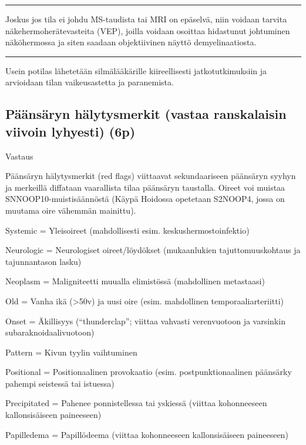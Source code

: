 \documentclass[
]{book}
\begin{document}
\begin{center}\rule{0.5\linewidth}{0.5pt}\end{center}

Joskus jos tila ei johdu MS-taudista tai MRI on epäselvä, niin voidaan tarvita näkehermoherätevasteita (VEP), joilla voidaan osoittaa hidastunut johtuminen näköhermossa ja siten saadaan objektiivinen näyttö demyelinaatiosta.

\begin{center}\rule{0.5\linewidth}{0.5pt}\end{center}

Usein potilas lähetetään silmälääkärille kiireellisesti jatkotutkimuksiin ja arvioidaan tilan vaikeusastetta ja paranemista.

\subsection{Päänsäryn hälytysmerkit (vastaa ranskalaisin viivoin lyhyesti) (6p)}\label{puxe4uxe4nsuxe4ryn-huxe4lytysmerkit-vastaa-ranskalaisin-viivoin-lyhyesti-6p}

Vastaus

Päänsäryn hälytysmerkit (red flags) viittaavat sekundaariseen päänsäryn syyhyn ja merkeillä diffataan vaarallista tilaa päänsäryn taustalla. Oireet voi muistaa SNNOOP10-muistisäännöstä (Käypä Hoidossa opetetaan S2NOOP4, jossa on muutama oire vähemmän mainittu).

Systemic = Yleisoireet (mahdollisesti esim. keskushermostoinfektio)

Neurologic = Neurologiset oireet/löydökset (mukaanlukien tajuttomuuskohtaus ja tajunnantason lasku)

Neoplasm = Maligniteetti muualla elimistössä (mahdollinen metastaasi)

Old = Vanha ikä (\textgreater50v) ja uusi oire (esim. mahdollinen temporaaliarteriitti)

Onset = Äkillisyys (``thunderclap''; viittaa vahvasti verenvuotoon ja varsinkin subaraknoidaalivuotoon)

Pattern = Kivun tyylin vaihtuminen

Positional = Positionaalinen provokaatio (esim. postpunktionaalinen päänsärky pahempi seistessä tai istuessa)

Precipitated = Pahenee ponnistellessa tai yskiessä (viittaa kohonneeseen kallonsisäiseen paineeseen)

Papilledema = Papillödeema (viittaa kohonneeseen kallonsisäiseen paineeseen)
\end{document}

